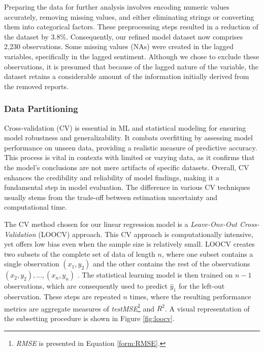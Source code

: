 Preparing the data for further analysis involves encoding numeric values accurately, removing missing values, and either eliminating strings or converting them into categorical factors. These preprocessing steps resulted in a reduction of the dataset by 3.8\%. Consequently, our refined model dataset now comprises 2,230 observations. Some missing values (NAs) were created in the lagged variables, specifically in the lagged sentiment. Although we chose to exclude these observations, it is presumed that because of the lagged nature of the variable, the dataset retains a considerable amount of the information initially derived from the removed reports.

\subsubsection{Data Partitioning}

Cross-validation (CV) is essential in ML and statistical modeling for ensuring model robustness and generalizability. It combats overfitting by assessing model performance on unseen data, providing a realistic measure of predictive accuracy. This process is vital in contexts with limited or varying data, as it confirms that the model's conclusions are not mere artifacts of specific datasets. Overall, CV enhances the credibility and reliability of model findings, making it a fundamental step in model evaluation. The difference in various CV techniques usually stems from the trade-off between estimation uncertainty and computational time.

The CV method chosen for our linear regression model is a \textit{Leave-One-Out Cross-Validation} (LOOCV) approach. This CV approach is computationally intensive, yet offers low bias even when the sample size is relatively small. LOOCV creates two subsets of the complete set of data of length \(n\), where one subset contains a single observation \((x_1, y_2)\) and the other contains the rest of the observations \({(x_2, y_2), ... , (x_n, y_n)}\) \parencite{witten2013introduction}. The statistical learning model is then trained on \(n-1\) observations, which are consequently used to predict \(\hat{y}_1\) for the left-out observation. These steps are repeated \(n\) times, where the resulting performance metrics are aggregate measures of \textit{testMSE}\footnote{\textit{RMSE} is presented in Equation \ref{form:RMSE}.} and \(R^2\). A visual representation of the subsetting procedure is shown in Figure \ref{fig:loocv}.

